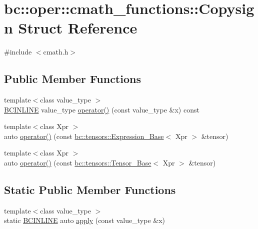 \hypertarget{structbc_1_1oper_1_1cmath__functions_1_1Copysign}{}\section{bc\+:\+:oper\+:\+:cmath\+\_\+functions\+:\+:Copysign Struct Reference}
\label{structbc_1_1oper_1_1cmath__functions_1_1Copysign}


{\ttfamily \#include $<$cmath.\+h$>$}

\subsection*{Public Member Functions}
\begin{DoxyCompactItemize}
\item 
{\footnotesize template$<$class value\+\_\+type $>$ }\\\hyperlink{common_8h_a6699e8b0449da5c0fafb878e59c1d4b1}{B\+C\+I\+N\+L\+I\+NE} value\+\_\+type \hyperlink{structbc_1_1oper_1_1cmath__functions_1_1Copysign_a07ad3634954a0cade8de41554b4b5a3b}{operator()} (const value\+\_\+type \&x) const
\item 
{\footnotesize template$<$class Xpr $>$ }\\auto \hyperlink{structbc_1_1oper_1_1cmath__functions_1_1Copysign_a7890274550d1904541a414597d5fecb2}{operator()} (const \hyperlink{classbc_1_1tensors_1_1Expression__Base}{bc\+::tensors\+::\+Expression\+\_\+\+Base}$<$ Xpr $>$ \&tensor)
\item 
{\footnotesize template$<$class Xpr $>$ }\\auto \hyperlink{structbc_1_1oper_1_1cmath__functions_1_1Copysign_aedd1cbd4c0e2b1a021b899ecf3a0964b}{operator()} (const \hyperlink{classbc_1_1tensors_1_1Tensor__Base}{bc\+::tensors\+::\+Tensor\+\_\+\+Base}$<$ Xpr $>$ \&tensor)
\end{DoxyCompactItemize}
\subsection*{Static Public Member Functions}
\begin{DoxyCompactItemize}
\item 
{\footnotesize template$<$class value\+\_\+type $>$ }\\static \hyperlink{common_8h_a6699e8b0449da5c0fafb878e59c1d4b1}{B\+C\+I\+N\+L\+I\+NE} auto \hyperlink{structbc_1_1oper_1_1cmath__functions_1_1Copysign_a0070bf204b95e6eabc100a53592bbd36}{apply} (const value\+\_\+type \&x)
\end{DoxyCompactItemize}



